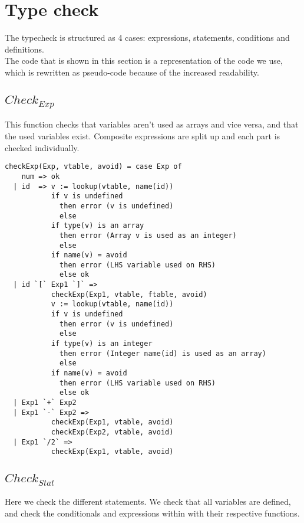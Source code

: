 \section{Type check}

The typecheck is structured as 4 cases: expressions, statements, conditions and definitions. \\
The code that is shown in this section is a representation of the code we use, 
which is rewritten as pseudo-code because of the increased readability.

\subsection{$Check_{Exp}$}

This function checks that variables aren't used as arrays and vice versa,
and that the used variables exist. Composite expressions are split up
and each part is checked individually.

\begin{verbatim}
checkExp(Exp, vtable, avoid) = case Exp of
    num => ok
  | id  => v := lookup(vtable, name(id))
           if v is undefined
             then error (v is undefined)
             else
           if type(v) is an array
             then error (Array v is used as an integer)
             else
           if name(v) = avoid
             then error (LHS variable used on RHS)
             else ok
  | id `[` Exp1 `]` =>
           checkExp(Exp1, vtable, ftable, avoid)
           v := lookup(vtable, name(id))
           if v is undefined
             then error (v is undefined)
             else
           if type(v) is an integer
             then error (Integer name(id) is used as an array)
             else
           if name(v) = avoid
             then error (LHS variable used on RHS)
             else ok
  | Exp1 `+` Exp2
  | Exp1 `-` Exp2 =>
           checkExp(Exp1, vtable, avoid)
           checkExp(Exp2, vtable, avoid)
  | Exp1 `/2` =>
           checkExp(Exp1, vtable, avoid)
\end{verbatim}

\subsection{$Check_{Stat}$}

Here we check the different statements. We check that all variables are
defined, and check the conditionals and expressions within with their
respective functions. 

